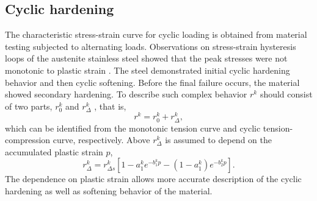 \documentclass[preprint,5p,twocolumn,11pt,sort&compress]{elsarticle}
\begin{document}
\subsection{Cyclic hardening}
\noindent
The characteristic stress-strain curve for cyclic loading is obtained from material testing subjected to alternating loads. Observations on stress-strain hysteresis loops of the austenite stainless steel showed that the peak stresses were not monotonic to plastic strain \cite{fang2015cyclic}. The steel demonstrated initial cyclic hardening behavior and then cyclic softening. Before the final failure occurs, the material showed secondary hardening. To describe such complex behavior $r^k$ should consist of two parts, $r_0^k$ and $r_{\Delta}^k$  \cite{fang2015cyclic}, that is,
\begin{equation}
\label{Equ:rk1}
{r^k} = r_0^k + r_\Delta ^k,
\end{equation}
which can be identified from the monotonic tension curve and cyclic tension-compression curve, respectively.
Above $r_\Delta ^k$ is assumed to depend on the accumulated plastic strain $p$,
\begin{equation}
\label{Equ:rdeltak1}
r_\Delta ^k = r_{\Delta s}^k\left[ {1 - a_1^k{e^{ - b_1^kp}} - (1-a_1^k){e^{ - b_2^kp}} }\right].
\label{Equ:rdeltak}
\end{equation}
The dependence on plastic strain allows more accurate description of the cyclic hardening as well as softening behavior of the material.
\end{document}
